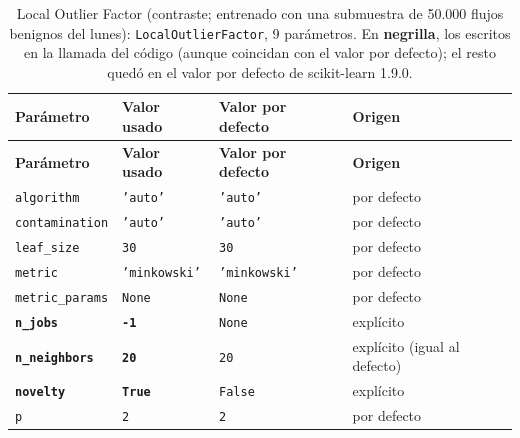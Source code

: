 \begin{longtable}{L{3.9cm} L{3.7cm} L{3.0cm} L{2.4cm}}
\caption{Local Outlier Factor (contraste; entrenado con una submuestra de 50.000 flujos benignos del lunes): \texttt{LocalOutlierFactor}, 9 parámetros. En \textbf{negrilla}, los escritos en la llamada del código (aunque coincidan con el valor por defecto); el resto quedó en el valor por defecto de scikit-learn 1.9.0.}\label{tab:param-lof}\\
\toprule
\textbf{Parámetro} & \textbf{Valor usado} & \textbf{Valor por defecto} & \textbf{Origen} \\
\midrule
\endfirsthead
\toprule
\textbf{Parámetro} & \textbf{Valor usado} & \textbf{Valor por defecto} & \textbf{Origen} \\
\midrule
\endhead
\bottomrule
\endfoot
\texttt{algorithm} & \texttt{'auto'} & \texttt{'auto'} & por defecto \\
\texttt{contamination} & \texttt{'auto'} & \texttt{'auto'} & por defecto \\
\texttt{leaf\_size} & \texttt{30} & \texttt{30} & por defecto \\
\texttt{metric} & \texttt{'minkowski'} & \texttt{'minkowski'} & por defecto \\
\texttt{metric\_params} & \texttt{None} & \texttt{None} & por defecto \\
\textbf{\texttt{n\_jobs}} & \textbf{\texttt{-1}} & \texttt{None} & explícito \\
\textbf{\texttt{n\_neighbors}} & \textbf{\texttt{20}} & \texttt{20} & explícito (igual al defecto) \\
\textbf{\texttt{novelty}} & \textbf{\texttt{True}} & \texttt{False} & explícito \\
\texttt{p} & \texttt{2} & \texttt{2} & por defecto \\
\end{longtable}

